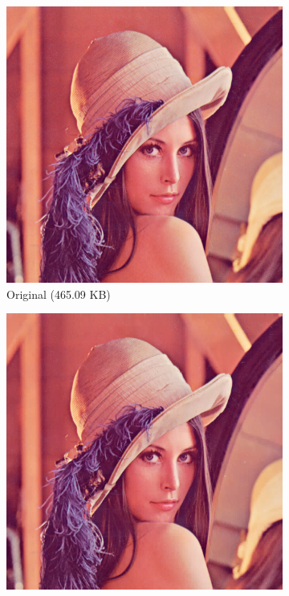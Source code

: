 \documentclass{article}
\theoremstyle{definition}
\begin{document}
  \begin{figure}
    \centering
    \begin{subfigure}[t]{.49\linewidth}
      \centering
      \includegraphics[width=.93\linewidth]{figs/lena.png}
      \caption{Original (465.09 KB)}
    \end{subfigure}
    \begin{subfigure}[t]{.49\linewidth}
      \centering
      \includegraphics[width=.93\linewidth]{figs/lena_haar_5.png}

\end{subfigure}
\end{figure}
\end{document}
